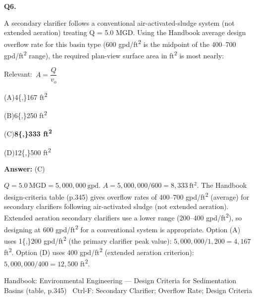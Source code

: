 \documentclass[11pt]{article}
\newcommand{\correct}[1]{\textbf{#1}\;{\color{accent}$\checkmark$}}
\newcommand{\optline}[2]{\par\noindent\hspace{1.2em}(#1)\hspace{0.6em}#2}
\begin{document}
\vspace{9pt}
\filbreak
\textbf{\color{accent}Q6.}\par\vspace{2pt}
A secondary clarifier follows a conventional air-activated-sludge system (not extended aeration) treating Q = 5.0 MGD. Using the Handbook average design overflow rate for this basin type (600 gpd/ft\textsuperscript{2} is the midpoint of the 400--700 gpd/ft\textsuperscript{2} range), the required plan-view surface area in ft\textsuperscript{2} is most nearly:\par\vspace{3pt}
{\small\color{soft}Relevant:}\ $A = \dfrac{Q}{v_o}$\par\vspace{3pt}
\optline{A}{4\{,\}167 ft\textsuperscript{2}}
\optline{B}{6\{,\}250 ft\textsuperscript{2}}
\optline{C}{\correct{8\{,\}333 ft\textsuperscript{2}}}
\optline{D}{12\{,\}500 ft\textsuperscript{2}}
\par\vspace{3pt}
\vspace{2pt}\par\noindent\colorbox{boxbg}{\parbox{\dimexpr\linewidth-2\fboxsep\relax}{%
\vspace{2pt}\textbf{Answer:} (C)\par\vspace{2pt}
{\small $Q = 5.0\ \mathrm{MGD} = 5{,}000{,}000\ \mathrm{gpd}$.  $A = 5{,}000{,}000/600 = 8{,}333\ \mathrm{ft^2}$. The Handbook design-criteria table (p.345) gives overflow rates of 400--700 gpd/ft\textsuperscript{2} (average) for secondary clarifiers following air-activated sludge (not extended aeration). Extended aeration secondary clarifiers use a lower range (200--400 gpd/ft\textsuperscript{2}), so designing at 600 gpd/ft\textsuperscript{2} for a conventional system is appropriate. Option (A) uses 1\{,\}200 gpd/ft\textsuperscript{2} (the primary clarifier peak value): $5{,}000{,}000/1{,}200 = 4{,}167$ ft\textsuperscript{2}. Option (D) uses 400 gpd/ft\textsuperscript{2} (extended aeration criterion): $5{,}000{,}000/400 = 12{,}500$ ft\textsuperscript{2}.}\par\vspace{2pt}
{\footnotesize\color{soft}Handbook: Environmental Engineering --- Design Criteria for Sedimentation Basins (table, p.345) \textbullet\ Ctrl-F: Secondary Clarifier; Overflow Rate; Design Criteria}\vspace{2pt}
}}
\end{document}

